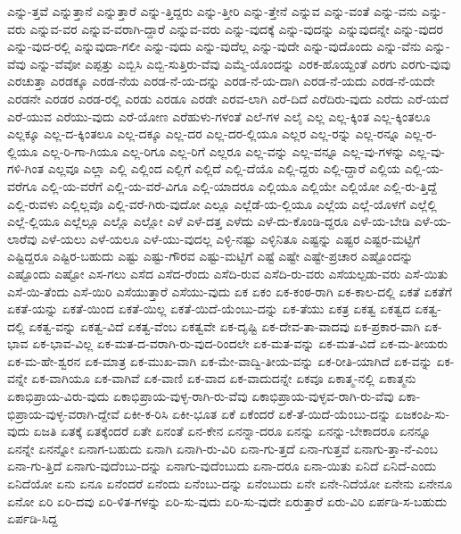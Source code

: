 {ಎನ್ನು-ತ್ತವೆ
ಎನ್ನುತ್ತಾನೆ
ಎನ್ನುತ್ತಾರೆ
ಎನ್ನು-ತ್ತಿದ್ದರು
ಎನ್ನು-ತ್ತೀರಿ
ಎನ್ನು-ತ್ತೇನೆ
ಎನ್ನುವ
ಎನ್ನು-ವಂತೆ
ಎನ್ನು-ವನು
ಎನ್ನು-ವರು
ಎನ್ನುವ-ವರ
ಎನ್ನುವ-ವರಾಗಿ-ದ್ದಾರೆ
ಎನ್ನುವ-ವರು
ಎನ್ನು-ವುದಕ್ಕೆ
ಎನ್ನು-ವುದನ್ನು
ಎನ್ನುವುದನ್ನೇ
ಎನ್ನು-ವುದರ
ಎನ್ನು-ವುದ-ರಲ್ಲಿ
ಎನ್ನುವುದಾ-ಗಲೀ
ಎನ್ನು-ವುದು
ಎನ್ನು-ವುದೆಲ್ಲ
ಎನ್ನು-ವುದೇ
ಎನ್ನು-ವುದೊಂದು
ಎನ್ನು-ವೆನು
ಎನ್ನು-ವೆವು
ಎನ್ನು-ವೆವೋ
ಎಪ್ಪತ್ತು
ಎಬ್ಬಿಸಿ
ಎಬ್ಬಿ-ಸುತ್ತಿರು-ವೆವು
ಎಮ್ಮೆ-ಯೊಂದನ್ನು
ಎರಕ-ಹೊಯ್ದಂತೆ
ಎರಗು
ಎರಗು-ವುವು
ಎರಚುತ್ತಾ
ಎರಡಕ್ಕೂ
ಎರಡ-ನೆಯ
ಎರಡ-ನೆ-ಯ-ದನ್ನು
ಎರಡ-ನೆ-ಯ-ದಾಗಿ
ಎರಡ-ನೆ-ಯದು
ಎರಡ-ನೆ-ಯದೇ
ಎರಡನೇ
ಎರಡರ
ಎರಡ-ರಲ್ಲಿ
ಎರಡು
ಎರಡೂ
ಎರಡೇ
ಎರವ-ಲಾಗಿ
ಎರೆ-ದಿದೆ
ಎರೆದಿರು-ವುದು
ಎರೆದು
ಎರೆ-ಯದೆ
ಎರೆ-ಯುವ
ಎರೆಯು-ವುದು
ಎರೆ-ಯೋಣ
ಎರೆಹುಳು-ಗಳಂತೆ
ಎಲೆ-ಗಳ
ಎಲೈ
ಎಲ್ಲ
ಎಲ್ಲ-ಕ್ಕಿಂತ
ಎಲ್ಲ-ಕ್ಕಿಂತಲೂ
ಎಲ್ಲಕ್ಕೂ
ಎಲ್ಲ-ದ-ಕ್ಕಿಂತಲೂ
ಎಲ್ಲ-ದಕ್ಕೂ
ಎಲ್ಲ-ದರ
ಎಲ್ಲ-ದರ-ಲ್ಲಿಯೂ
ಎಲ್ಲರ
ಎಲ್ಲ-ರನ್ನು
ಎಲ್ಲ-ರನ್ನೂ
ಎಲ್ಲ-ರ-ಲ್ಲಿಯೂ
ಎಲ್ಲ-ರಿ-ಗಾ-ಗಿಯೂ
ಎಲ್ಲ-ರಿಗೂ
ಎಲ್ಲ-ರಿಗೆ
ಎಲ್ಲರೂ
ಎಲ್ಲ-ವನ್ನು
ಎಲ್ಲ-ವನ್ನೂ
ಎಲ್ಲ-ವು-ಗಳನ್ನು
ಎಲ್ಲ-ವು-ಗಳಿ-ಗಿಂತ
ಎಲ್ಲವೂ
ಎಲ್ಲಾ
ಎಲ್ಲಿ
ಎಲ್ಲಿಂದ
ಎಲ್ಲಿಗೆ
ಎಲ್ಲಿದೆ
ಎಲ್ಲಿ-ದೆಯೊ
ಎಲ್ಲಿ-ದ್ದರು
ಎಲ್ಲಿ-ದ್ದಾರೆ
ಎಲ್ಲಿಯ
ಎಲ್ಲಿ-ಯ-ವರೆಗೂ
ಎಲ್ಲಿ-ಯ-ವರೆಗೆ
ಎಲ್ಲಿ-ಯ-ವರೆ-ವಿಗೂ
ಎಲ್ಲಿ-ಯಾದರೂ
ಎಲ್ಲಿಯೂ
ಎಲ್ಲಿಯೇ
ಎಲ್ಲಿಯೋ
ಎಲ್ಲಿ-ರು-ತ್ತಿದ್ದೆ
ಎಲ್ಲಿ-ರುವಳು
ಎಲ್ಲಿಲ್ಲವೊ
ಎಲ್ಲಿ-ವರೆ-ಗಿರು-ವುದೋ
ಎಲ್ಲೂ
ಎಲ್ಲೆಡೆ-ಯ-ಲ್ಲಿಯೂ
ಎಲ್ಲೆಯ
ಎಲ್ಲೆ-ಯೊಳಗೆ
ಎಲ್ಲೆಲ್ಲಿ
ಎಲ್ಲೆ-ಲ್ಲಿಯೂ
ಎಲ್ಲೆಲ್ಲೂ
ಎಲ್ಲೊ
ಎಲ್ಲೋ
ಎಳೆ
ಎಳೆ-ದತ್ತ
ಎಳೆದು
ಎಳೆ-ದು-ಕೊಂಡಿ-ದ್ದರೂ
ಎಳೆ-ಯ-ಬೇಡಿ
ಎಳೆ-ಯ-ಲಾರೆವು
ಎಳೆ-ಯಲು
ಎಳೆ-ಯಲೂ
ಎಳೆ-ಯು-ವುದಲ್ಲ
ಎಳ್ಳಿ-ನಷ್ಟು
ಎಳ್ಳಿನಿತೂ
ಎಷ್ಟನ್ನು
ಎಷ್ಟರ
ಎಷ್ಟರ-ಮಟ್ಟಿಗೆ
ಎಷ್ಟಿದ್ದರೂ
ಎಷ್ಟಿರ-ಬಹುದು
ಎಷ್ಟು
ಎಷ್ಟು-ಗೌರವ
ಎಷ್ಟು-ಮಟ್ಟಿಗೆ
ಎಷ್ಟೆ
ಎಷ್ಟೇ
ಎಷ್ಟೇ-ಪ್ರಚಾರ
ಎಷ್ಟೊಂದನ್ನು
ಎಷ್ಟೊಂದು
ಎಷ್ಟೋ
ಎಸ-ಗಲು
ಎಸೆದ
ಎಸೆದ-ರೆಂದು
ಎಸೆದಿ-ರುವ
ಎಸೆದಿ-ರು-ವರು
ಎಸೆಯಲ್ಪಡು-ವರು
ಎಸೆ-ಯಿತು
ಎಸೆ-ಯಿ-ತೆಂದು
ಎಸೆ-ಯಿರಿ
ಎಸೆಯುತ್ತಾರೆ
ಎಸೆಯು-ವುದು
ಏಕ
ಏಕಂ
ಏಕ-ಕಂಠ-ರಾಗಿ
ಏಕ-ಕಾಲ-ದಲ್ಲಿ
ಏಕತೆ
ಏಕತೆಗೆ
ಏಕತೆ-ಯನ್ನು
ಏಕತೆ-ಯಿಂದ
ಏಕತೆ-ಯಿಲ್ಲ
ಏಕತೆ-ಯಿದೆ-ಯೆಂಬು-ದನ್ನು
ಏಕ-ತೆಯು
ಏಕತ್ರ
ಏಕತ್ವ
ಏಕತ್ವದ
ಏಕತ್ವ-ದಲ್ಲಿ
ಏಕತ್ವ-ವನ್ನು
ಏಕತ್ವ-ವಿದೆ
ಏಕತ್ವ-ವೆಂಬ
ಏಕತ್ವವೇ
ಏಕ-ದೃಷ್ಟಿ
ಏಕ-ದೇವ-ತಾ-ವಾದವು
ಏಕ-ಪ್ರಕಾರ-ವಾಗಿ
ಏಕ-ಭಾವ
ಏಕ-ಭಾವ-ವಿಲ್ಲ
ಏಕ-ಮತ-ದ-ವರಾಗಿ-ರು-ವುದ-ರಿಂದಲೇ
ಏಕ-ಮತ-ವನ್ನು
ಏಕ-ಮತ-ವಿದೆ
ಏಕ-ಮ-ತೀಯರು
ಏಕ-ಮ-ಹೇ-ಶ್ವರನ
ಏಕ-ಮಾತ್ರ
ಏಕ-ಮುಖ-ವಾಗಿ
ಏಕ-ಮೇ-ವಾದ್ವಿ-ತೀಯ-ವನ್ನು
ಏಕ-ರೀತಿ-ಯಾಗಿದೆ
ಏಕ-ವನ್ನು
ಏಕ-ವನ್ನೇ
ಏಕ-ವಾಗಿಯೂ
ಏಕ-ವಾಗಿವೆ
ಏಕ-ವಾಣಿ
ಏಕ-ವಾದ
ಏಕ-ವಾದುದನ್ನೇ
ಏಕವೂ
ಏಕಾತ್ಮ-ನಲ್ಲಿ
ಏಕಾತ್ಮನು
ಏಕಾಭಿಪ್ರಾಯ-ವಿರು-ವುದು
ಏಕಾಭಿಪ್ರಾಯ-ವುಳ್ಳ-ರಾಗಿ-ರು-ವೆವು
ಏಕಾಭಿಪ್ರಾಯ-ವುಳ್ಳವ-ರಾಗಿ-ರು-ವೆವು
ಏಕಾ-ಭಿಪ್ರಾಯ-ವುಳ್ಳ-ವರಾಗಿ-ದ್ದೇವೆ
ಏಕೀ-ಕ-ರಿಸಿ
ಏಕೀ-ಭೂತ
ಏಕೆ
ಏಕೆಂದರೆ
ಏಕೆ-ತೆ-ಯಿದೆ-ಯೆಂಬು-ದನ್ನು
ಏಜಕಂಪಿ-ಸು-ವುದು
ಏಜತಿ
ಏತಕ್ಕೆ
ಏತಕ್ಕೆಂದರೆ
ಏತೇ
ಏನಂತೆ
ಏನ-ಕೇನ
ಏನನ್ನಾ-ದರೂ
ಏನನ್ನು
ಏನನ್ನು-ಬೇಕಾದರೂ
ಏನನ್ನೂ
ಏನನ್ನೇ
ಏನನ್ನೋ
ಏನಾಗ-ಬಹುದು
ಏನಾಗಿ
ಏನಾಗಿ-ರು-ವಿರಿ
ಏನಾ-ಗು-ತ್ತದೆ
ಏನಾ-ಗುತ್ತವೆ
ಏನಾಗು-ತ್ತಾ-ನೆ-ಎಂಬ
ಏನಾ-ಗು-ತ್ತಿದೆ
ಏನಾಗು-ವುದೆಂಬು-ದನ್ನು
ಏನಾಗು-ವುದೆಂಬುದು
ಏನಾ-ದರೂ
ಏನಾ-ಯಿತು
ಏನಿದೆ
ಏನಿದೆ-ಎಂದು
ಏನಿದೆಯೋ
ಏನು
ಏನೂ
ಏನೆಂದರೆ
ಏನೆಂದು
ಏನೆಂಬು-ದನ್ನು
ಏನೆಂಬುದು
ಏನೇ
ಏನೇ-ನಿದೆಯೋ
ಏನೇನು
ಏನೇನೂ
ಏನೋ
ಏರಿ
ಏರಿ-ದವು
ಏರಿ-ಳಿತ-ಗಳನ್ನು
ಏರಿ-ಸು-ವುದು
ಏರಿ-ಸು-ವುದೇ
ಏರುತ್ತಾರೆ
ಏರು-ವಿರಿ
ಏರ್ಪಡಿ-ಸ-ಬಹುದು
ಏರ್ಪಡಿ-ಸಿದ್ದ
}

